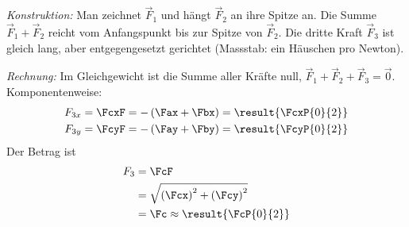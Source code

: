 \emph{Konstruktion:} Man zeichnet $\vec F_1$ und hängt $\vec F_2$ an ihre Spitze an. Die Summe $\vec F_1+\vec F_2$ reicht vom Anfangspunkt bis zur Spitze von $\vec F_2$. Die dritte Kraft $\vec F_3$ ist gleich lang, aber entgegengesetzt gerichtet (Massstab: ein Häuschen pro Newton).
\begin{center}
\end{center}

\emph{Rechnung:} Im Gleichgewicht ist die Summe aller Kräfte null, $\vec F_1+\vec F_2+\vec F_3 = \vec 0$. Komponentenweise:
\begin{align}
 F_{3x} &= \FcxF = -\left(\Fax+\Fbx\right) = \result{\FcxP{0}{2}} \\
 F_{3y} &= \FcyF = -\left(\Fay+\Fby\right) = \result{\FcyP{0}{2}}
\end{align}
Der Betrag ist
\begin{align}
 F_3 &= \FcF \\
   &= \sqrt{\left(\Fcx\right)^2+\left(\Fcy\right)^2} \\
   &= \Fc \approx \result{\FcP{0}{2}}
\end{align}

